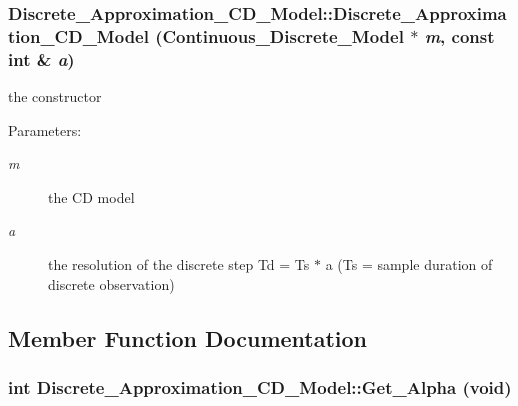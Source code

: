\hypertarget{class_discrete___approximation___c_d___model_564a37759c294b73299bbcb9f29897d1}{
\subsubsection[{Discrete\_\-Approximation\_\-CD\_\-Model}]{\setlength{\rightskip}{0pt plus 5cm}Discrete\_\-Approximation\_\-CD\_\-Model::Discrete\_\-Approximation\_\-CD\_\-Model ({\bf Continuous\_\-Discrete\_\-Model} $\ast$ {\em m}, \/  const int \& {\em a})}}
\label{class_discrete___approximation___c_d___model_564a37759c294b73299bbcb9f29897d1}


the constructor 

\begin{Desc}
\item[Parameters:]
\begin{description}
\item[{\em m}]the CD model \item[{\em a}]the resolution of the discrete step Td = Ts $\ast$ a (Ts = sample duration of discrete observation) \end{description}
\end{Desc}


\subsection{Member Function Documentation}
\hypertarget{class_discrete___approximation___c_d___model_37b248fa0e24d9c70145ca546ee2a597}{
\subsubsection[{Get\_\-Alpha}]{\setlength{\rightskip}{0pt plus 5cm}int Discrete\_\-Approximation\_\-CD\_\-Model::Get\_\-Alpha (void)}}
\label{class_discrete___approximation___c_d___model_37b248fa0e24d9c70145ca546ee2a597}


